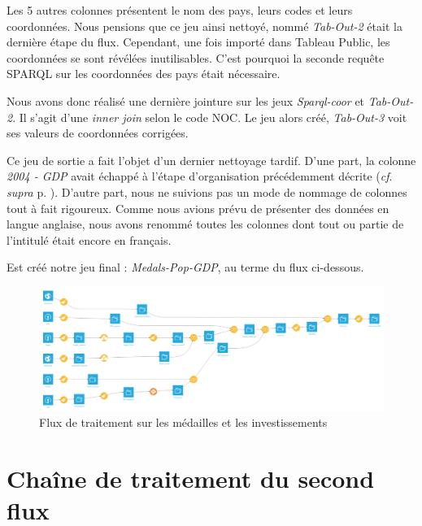 \documentclass[hidelinks, 12pt]{report}
\begin{document}
Les 5 autres colonnes présentent le nom des pays, leurs codes et leurs coordonnées. Nous pensions que ce jeu ainsi nettoyé, nommé \textit{Tab-Out-2} était la dernière étape du flux. Cependant, une fois importé dans Tableau Public, les coordonnées se sont révélées inutilisables. C'est pourquoi la seconde requête SPARQL sur les coordonnées des pays était nécessaire. 

Nous avons donc réalisé une dernière jointure sur les jeux \textit{Sparql-coor} et \textit{Tab-Out-2}. Il s'agit d'une \textit{inner join} selon le code NOC. Le jeu alors créé, \textit{Tab-Out-3} voit ses valeurs de coordonnées corrigées.

Ce jeu de sortie a fait l'objet d'un dernier nettoyage tardif. D'une part, la colonne \textit{2004 - GDP} avait échappé à l'étape d'organisation précédemment décrite (\textit{cf}. \textit{supra} p. \pageref{orga}). D'autre part, nous ne suivions pas un mode de nommage de colonnes tout à fait rigoureux. Comme nous avions prévu de présenter des données en langue anglaise, nous avons renommé toutes les colonnes dont tout ou partie de l'intitulé était encore en français.

Est créé notre jeu final : \textit{Medals-Pop-GDP}, au terme du flux ci-dessous.

\begin{center}
	\begin{figure}[H]
		\setlength{\belowcaptionskip}{-35pt}
		\includegraphics[scale=0.35]{images/flow-medals-full.png}
		\caption{Flux de traitement sur les médailles et les investissements}
	\end{figure}
\end{center}





%





\section{Chaîne de traitement du second flux}
\end{document}
